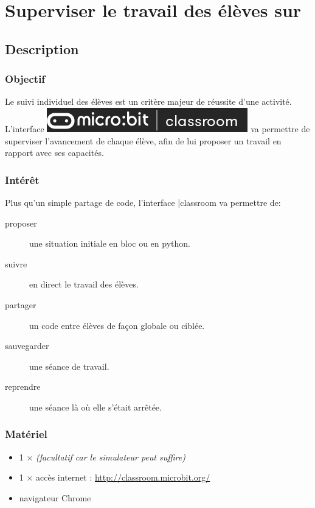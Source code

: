 

\section{Superviser le travail des élèves sur \mb}


\subsection{Description}

\subsubsection{Objectif}


\begin{formule}
Le suivi individuel des élèves est un critère majeur de réussite d'une activité. 
L'interface \includegraphics[scale=0.3]{res/classroom_logo.png} va permettre de superviser 
l'avancement de chaque élève, afin de lui proposer un travail en rapport avec ses capacités.
\end{formule}


\subsubsection{Intérêt}

Plus qu'un simple partage de code, l'interface \mb |classroom va permettre de:

\begin{description}
    \item [proposer] une situation initiale en bloc ou en python.
    \item [suivre] en direct le travail des élèves.
    \item [partager] un code entre élèves de façon globale ou ciblée.
    \item [sauvegarder] une séance de travail.
    \item [reprendre] une séance là où elle s'était arrêtée.
\end{description}


\subsubsection{Matériel}
\begin{itemize}
    \item 1 $\times$ \matosMb \emph{(facultatif car le simulateur peut suffire)}
    \item 1 $\times$ accès internet : \url{http://classroom.microbit.org/}
%   
    \item navigateur Chrome\textregistered
\end{itemize}


